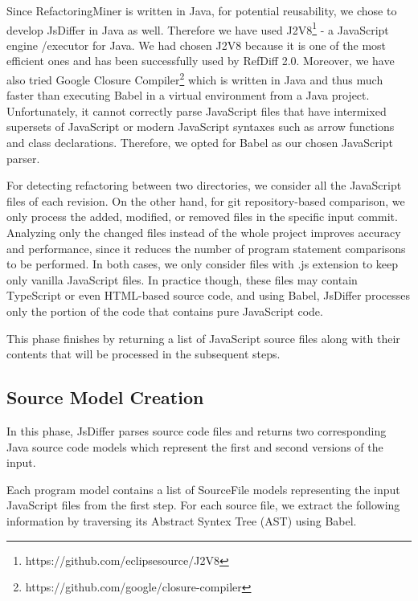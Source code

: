 \documentclass[letterpaper,12pt,onecolumn,final]{report}
\begin{document}
Since RefactoringMiner is written in Java, for potential reusability, we chose to develop JsDiffer in Java as well. Therefore we have used J2V8\footnote{https://github.com/eclipsesource/J2V8} - a JavaScript engine /executor for Java. We had chosen J2V8 because it is one of the most efficient ones and has been successfully used by RefDiff 2.0\cite{Silva2020}. Moreover, we have also tried Google Closure Compiler\footnote{https://github.com/google/closure-compiler} which is written in Java and thus much faster than executing Babel in a virtual environment from a Java project. Unfortunately, it cannot correctly parse JavaScript files that have intermixed supersets of JavaScript or modern JavaScript syntaxes such as arrow functions and class declarations. Therefore, we opted for Babel as our chosen JavaScript parser.

For detecting refactoring between two directories, we consider all the JavaScript files of each revision. On the other hand, for git repository-based comparison, we only process the added, modified, or removed files in the specific input commit. Analyzing only the changed files instead of the whole project improves accuracy and performance, since it reduces the number of program statement comparisons to be performed. In both cases, we only consider files with .js extension to keep only vanilla JavaScript files. In practice though, these files may contain TypeScript or even HTML-based source code, and using Babel, JsDiffer processes only the portion of the code that contains pure JavaScript code.

This phase finishes by returning a list of JavaScript source files along with their contents that will be processed in the subsequent steps.

\subsection {Source Model Creation}
In this phase, JsDiffer parses source code files and returns two corresponding Java source code models which represent the first and second versions of the input.

Each program model contains a list of SourceFile models representing the input JavaScript files from the first step. For each source file, we extract the following information by traversing its Abstract Syntex Tree (AST) using Babel.
\end{document}
